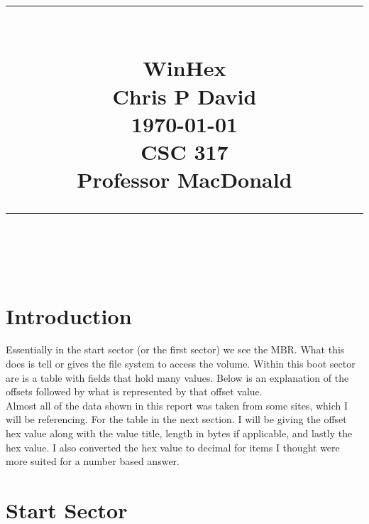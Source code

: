 \documentclass[12ptletterpaper]{paper}
\title{
	\begin{center}
		\normalfont \normalsize
		\rule{\linewidth}{.5pt} \\[0.4cm] 
		\huge {WinHex} \\ 
		\small{Chris P David}\\
		{\today}\\
		{CSC 317}\\
		{Professor MacDonald}
		\rule{\linewidth}{.5pt} \\
	\end{center}
}
\newcommand\tab[1][1cm]{\hspace*{#1}}
\begin{document}
	\begin{titlepage}
		\clearpage
		\maketitle
		\thispagestyle{empty}
	\end{titlepage}
	\pagebreak	
	\tableofcontents
	\begin{flushleft}
		\pagebreak
		\section{Introduction}
		\tab Essentially in the start sector (or the first sector) we see the MBR. What this does is tell or gives the file system to access the volume. Within this boot sector are is a table with fields that hold many values. Below is an explanation of the offsets followed by what is represented by that offset value.\\
		\tab Almost all of the data shown in this report was taken from some sites, which I will be referencing. For the table in the next section. I will be giving the offset hex value along with the value title, length in bytes if applicable, and lastly the hex value. I also converted the hex value to decimal for items I thought were more suited for a number based answer.
		
		\section{Start Sector }
		

\end{flushleft}
\end{document}
